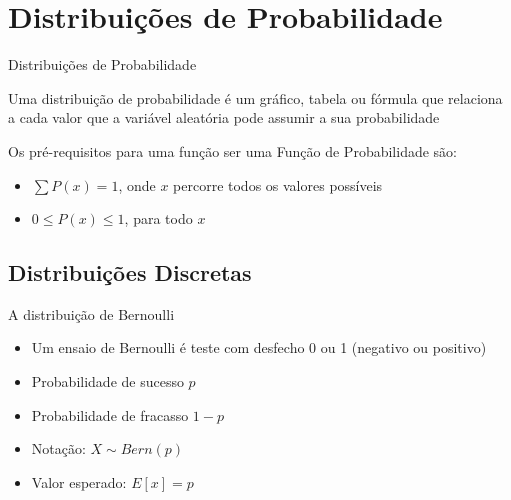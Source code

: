 \documentclass{beamer}
\begin{document}

\section{Distribuições de Probabilidade}
\begin{frame}{Distribuições de Probabilidade}
  \begin{definition}
    Uma \alert{distribuição de probabilidade} é um gráfico, tabela ou
    fórmula que relaciona a cada valor que a variável aleatória pode
    assumir a sua probabilidade
  \end{definition}
  Os pré-requisitos para uma função ser uma Função de Probabilidade
  são:
  \begin{itemize}
  \item $\sum P(x) = 1$, onde $x$ percorre todos os valores possíveis
  \item $0 \le P(x) \le 1$, para todo $x$
  \end{itemize}
\end{frame}

\subsection{Distribuições Discretas}

\begin{frame}{A distribuição de Bernoulli}
  \begin{itemize}
  \item Um ensaio de Bernoulli é teste com desfecho 0 ou 1 (negativo
    ou positivo)
  \item Probabilidade de sucesso $p$
  \item Probabilidade de fracasso $1-p$
  \item Notação: $X \sim Bern(p)$
  \item Valor esperado: $E[x] = p$
  \end{itemize}
\end{frame}
\end{document}
